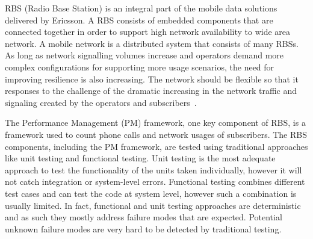 RBS (Radio Base Station) is an integral part of the mobile data solutions delivered by Ericsson. A RBS consists of embedded components that are connected together in order to support high network availability to wide area network. A mobile network is a distributed system that consists of many RBSs. 
As long as network signalling volumes increase and operators demand more complex configurations for supporting more usage scenarios, the need for improving resilience is also increasing. The network should be flexible so that it responses to the challenge of the dramatic increasing in the network traffic and signaling created by the operators and subscribers~\cite{availability}.

The Performance Management (PM) framework, one key component of RBS, is a framework used to count phone calls and network usages of subscribers. 
The RBS components, including the PM framework, are tested using traditional  approaches  like unit testing and functional testing.  Unit  testing  is the most adequate approach to test the functionality of the units taken individually, however it will not catch integration or system-level errors. Functional testing combines different test cases and can test the code at system level, however such a combination is usually limited. In fact, functional and unit testing approaches are deterministic and as such they mostly address failure modes that are expected. Potential unknown failure modes are very hard to be detected by traditional testing.

